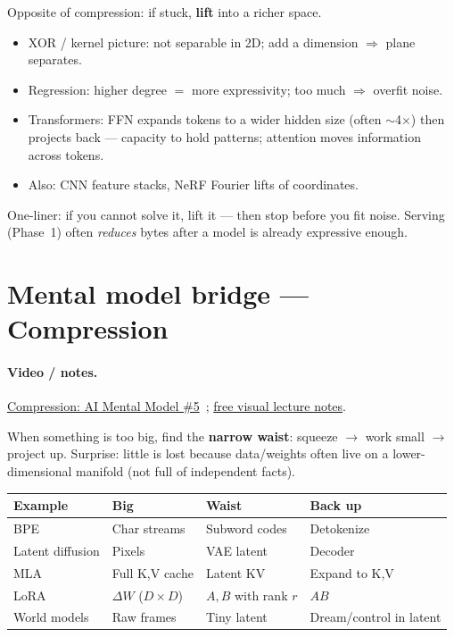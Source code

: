 \documentclass[11pt,a4paper]{article}
\begin{document}
Opposite of compression: if stuck, \textbf{lift} into a richer space.
\begin{itemize}[leftmargin=*]
  \item XOR / kernel picture: not separable in 2D; add a dimension $\Rightarrow$ plane separates.
  \item Regression: higher degree $=$ more expressivity; too much $\Rightarrow$ overfit noise.
  \item Transformers: FFN expands tokens to a wider hidden size (often $\sim$4$\times$) then projects back --- capacity to hold patterns; attention moves information across tokens.
  \item Also: CNN feature stacks, NeRF Fourier lifts of coordinates.
\end{itemize}
\noindent One-liner: if you cannot solve it, lift it --- then stop before you fit noise.
Serving (Phase~1) often \emph{reduces} bytes after a model is already expressive enough.

\section{Mental model bridge --- Compression}
\paragraph{Video / notes.}
\href{https://www.youtube.com/watch?v=hGS6RbAYLl0}{Compression: AI Mental Model \#5}~\cite{vizuara-compression-yt};
\href{https://vizuaraai.github.io/great-mental-models-of-ai/lecture-05-compression.html}{free visual lecture notes}.

When something is too big, find the \textbf{narrow waist}: squeeze $\rightarrow$ work small $\rightarrow$ project up.
Surprise: little is lost because data/weights often live on a lower-dimensional manifold (not full of independent facts).

\begin{tabularx}{\textwidth}{@{}lYYY@{}}
\toprule
\textbf{Example} & \textbf{Big} & \textbf{Waist} & \textbf{Back up} \\
\midrule
BPE & Char streams & Subword codes & Detokenize \\
Latent diffusion & Pixels & VAE latent & Decoder \\
MLA & Full K,V cache & Latent KV & Expand to K,V \\
LoRA & $\Delta W$ ($D\times D$) & $A,B$ with rank $r$ & $AB$ \\
World models & Raw frames & Tiny latent & Dream/control in latent \\
\bottomrule
\end{tabularx}
\end{document}
